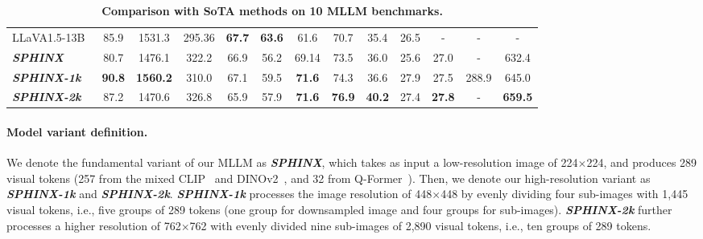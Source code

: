 \documentclass{article} \usepackage{iclr2024_conference,times}
\newcommand{\sphinx}{\textcolor{Goldenrod3}{\textbf{\textit{SPHINX}}}~}
\newcommand{\sphinxonek}{\textcolor{Goldenrod3}{\textbf{\textit{SPHINX-1k}}}~}
\newcommand{\sphinxtwok}{\textcolor{Goldenrod3}{\textbf{\textit{SPHINX-2k}}}~}
\begin{document}
\begin{table}[]
{\begin{tabular}{l|cccccccccccc}
LLaVA1.5-13B~\citep{Liu2023ImprovedBW}                 & 85.9          & 1531.3          & 295.36          & \textbf{67.7} & \textbf{63.6} & 61.6           & 70.7          & 35.4          & 26.5          & -    & - & -           \\
\cmidrule(lr){1-1}\cmidrule(lr){2-13}
\rowcolor[gray]{0.95}
\sphinx                      & 80.7          & 1476.1          & 322.2           & 66.9          & 56.2          & 69.14          & 73.5          & 36.0          & 25.6          & 27.0  & - & 632.4         \\
\rowcolor[gray]{0.95}
\sphinxonek                 & \textbf{90.8} & \textbf{1560.2} & 310.0           & 67.1          & 59.5          & \textbf{71.6}  & 74.3           & 36.6 & 27.9          & 27.5 & 288.9 & 645.0 \\
\rowcolor[gray]{0.95}
\sphinxtwok                 & 87.2           & 1470.6           & 326.8          &   65.9             &   57.9           & \textbf{71.6} & \textbf{76.9}  &   \textbf{40.2}             &     27.4     &  \textbf{27.8} & - & \textbf{659.5} \\
\bottomrule
\end{tabular}
} \caption{\textbf{Comparison with SoTA methods on 10 MLLM benchmarks.}}
\label{table:mm}
\end{table}

\paragraph{Model variant definition.} We denote the fundamental variant of our MLLM as \textcolor{Goldenrod3}{\textbf{\textit{SPHINX}}}, which takes as input a low-resolution image of 224$\times$224, and produces 289 visual tokens (257 from the mixed CLIP~\citep{radford2021learning} and DINOv2~\citep{oquab2023dinov2}, and 32 from Q-Former~\citep{li2023blip}). Then, we denote our high-resolution variant as \textcolor{Goldenrod3}{\textbf{\textit{SPHINX-1k}}} and \textcolor{Goldenrod3}{\textbf{\textit{SPHINX-2k}}}. \textcolor{Goldenrod3}{\textbf{\textit{SPHINX-1k}}} processes the image resolution of 448$\times$448 by evenly dividing four sub-images with 1,445 visual tokens, i.e., five groups of 289 tokens (one group for downsampled image and four groups for sub-images). \textcolor{Goldenrod3}{\textbf{\textit{SPHINX-2k}}} further processes a higher resolution of 762$\times$762 with evenly divided nine sub-images of 2,890 visual tokens, i.e., ten groups of 289 tokens. 
\end{document}
